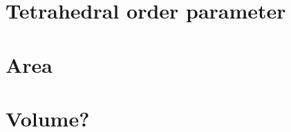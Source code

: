 \section{Tetrahedral order parameter}
%
%
\begin{figure}[htpb]%
    \centering%
    \caption{}%
\end{figure}%
%
\begin{figure}[htpb]%
    \centering%
    \caption{}%
\end{figure}%
%
\begin{figure}[htpb]%
    \centering%
    \caption{}%
\end{figure}%

\FloatBarrier
\section{Area}
\section{Volume?}


